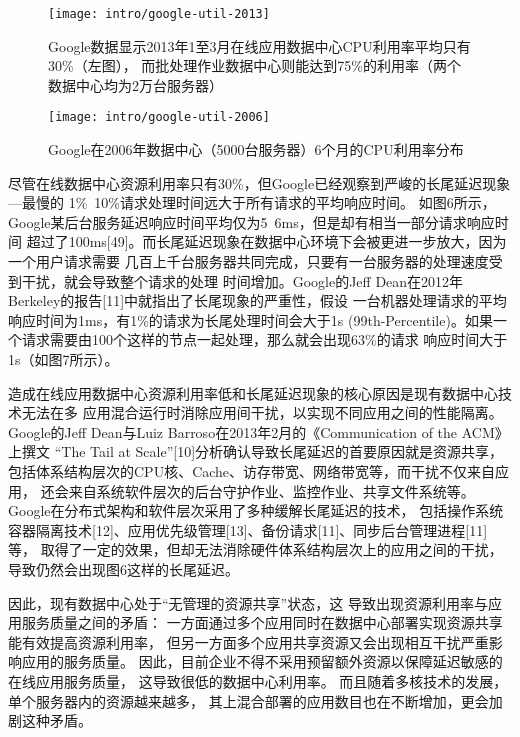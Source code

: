 \begin{figure}
\begin{minipage}{0.57\textwidth}
  \centering
  \texttt{[image: intro/google-util-2013]}
  \caption[Google数据中心CPU利用率分布（2013年）]
    {Google数据显示2013年1至3月在线应用数据中心CPU利用率平均只有30\%（左图），
     而批处理作业数据中心则能达到75\%的利用率（两个数据中心均为2万台服务器）}
  \label{fig:google-util-2013}
\end{minipage}\hfill
\begin{minipage}{0.39\textwidth}
  \centering
  \texttt{[image: intro/google-util-2006]}
  \caption[Google数据中心CPU利用率分布（2006年）]
    {Google在2006年数据中心（5000台服务器）6个月的CPU利用率分布}
  \label{fig:google-util-2006}
\end{minipage}
\end{figure}

尽管在线数据中心资源利用率只有30\%，但Google已经观察到严峻的长尾延迟现象---最慢的
1\%~10\%请求处理时间远大于所有请求的平均响应时间。
如图6所示，Google某后台服务延迟响应时间平均仅为5~6ms，但是却有相当一部分请求响应时间
超过了100ms[49]。而长尾延迟现象在数据中心环境下会被更进一步放大，因为一个用户请求需要
几百上千台服务器共同完成，只要有一台服务器的处理速度受到干扰，就会导致整个请求的处理
时间增加。Google的Jeff Dean在2012年Berkeley的报告[11]中就指出了长尾现象的严重性，假设
一台机器处理请求的平均响应时间为1ms，有1\%的请求为长尾处理时间会大于1s 
(99th-Percentile)。如果一个请求需要由100个这样的节点一起处理，那么就会出现63\%的请求
响应时间大于1s（如图7所示）。

造成在线应用数据中心资源利用率低和长尾延迟现象的核心原因是现有数据中心技术无法在多
应用混合运行时消除应用间干扰，以实现不同应用之间的性能隔离。
Google的Jeff Dean与Luiz Barroso在2013年2月的《Communication of the ACM》上撰文
“The Tail at Scale”[10]分析确认导致长尾延迟的首要原因就是资源共享，
包括体系结构层次的CPU核、Cache、访存带宽、网络带宽等，而干扰不仅来自应用，
还会来自系统软件层次的后台守护作业、监控作业、共享文件系统等。
Google在分布式架构和软件层次采用了多种缓解长尾延迟的技术，
包括操作系统容器隔离技术[12]、应用优先级管理[13]、备份请求[11]、同步后台管理进程[11]等，
取得了一定的效果，但却无法消除硬件体系结构层次上的应用之间的干扰，
导致仍然会出现图6这样的长尾延迟。

因此，现有数据中心处于“无管理的资源共享”状态，这
导致出现资源利用率与应用服务质量之间的矛盾：
一方面通过多个应用同时在数据中心部署实现资源共享能有效提高资源利用率，
但另一方面多个应用共享资源又会出现相互干扰严重影响应用的服务质量。
因此，目前企业不得不采用预留额外资源以保障延迟敏感的在线应用服务质量，
这导致很低的数据中心利用率。
而且随着多核技术的发展，单个服务器内的资源越来越多，
其上混合部署的应用数目也在不断增加，更会加剧这种矛盾。


